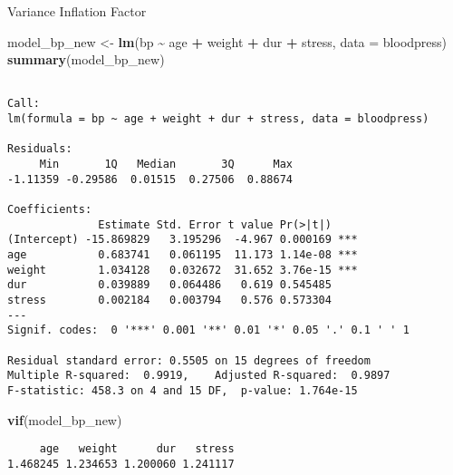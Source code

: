 \documentclass[
  ignorenonframetext,
]{beamer}
\newenvironment{Shaded}{\begin{snugshade}}{\end{snugshade}}
\newcommand{\AttributeTok}[1]{\textcolor[rgb]{0.13,0.29,0.53}{#1}}
\newcommand{\FunctionTok}[1]{\textcolor[rgb]{0.13,0.29,0.53}{\textbf{#1}}}
\newcommand{\NormalTok}[1]{#1}
\newcommand{\OtherTok}[1]{\textcolor[rgb]{0.56,0.35,0.01}{#1}}
\newcommand{\SpecialCharTok}[1]{\textcolor[rgb]{0.81,0.36,0.00}{\textbf{#1}}}
\begin{document}
\begin{frame}[fragile]{Variance Inflation Factor}
\protect\hypertarget{variance-inflation-factor-4}{}
\tiny

\begin{Shaded}
\begin{Highlighting}[]
\NormalTok{model\_bp\_new }\OtherTok{\textless{}{-}} \FunctionTok{lm}\NormalTok{(bp }\SpecialCharTok{\textasciitilde{}}\NormalTok{ age }\SpecialCharTok{+}\NormalTok{ weight }\SpecialCharTok{+}\NormalTok{ dur }\SpecialCharTok{+}\NormalTok{ stress, }\AttributeTok{data =}\NormalTok{ bloodpress)}
\FunctionTok{summary}\NormalTok{(model\_bp\_new)}
\end{Highlighting}
\end{Shaded}

\begin{verbatim}

Call:
lm(formula = bp ~ age + weight + dur + stress, data = bloodpress)

Residuals:
     Min       1Q   Median       3Q      Max 
-1.11359 -0.29586  0.01515  0.27506  0.88674 

Coefficients:
              Estimate Std. Error t value Pr(>|t|)    
(Intercept) -15.869829   3.195296  -4.967 0.000169 ***
age           0.683741   0.061195  11.173 1.14e-08 ***
weight        1.034128   0.032672  31.652 3.76e-15 ***
dur           0.039889   0.064486   0.619 0.545485    
stress        0.002184   0.003794   0.576 0.573304    
---
Signif. codes:  0 '***' 0.001 '**' 0.01 '*' 0.05 '.' 0.1 ' ' 1

Residual standard error: 0.5505 on 15 degrees of freedom
Multiple R-squared:  0.9919,    Adjusted R-squared:  0.9897 
F-statistic: 458.3 on 4 and 15 DF,  p-value: 1.764e-15
\end{verbatim}

\begin{Shaded}
\begin{Highlighting}[]
\FunctionTok{vif}\NormalTok{(model\_bp\_new)}
\end{Highlighting}
\end{Shaded}

\begin{verbatim}
     age   weight      dur   stress 
1.468245 1.234653 1.200060 1.241117 
\end{verbatim}

\normalsize
\end{frame}
\end{document}
